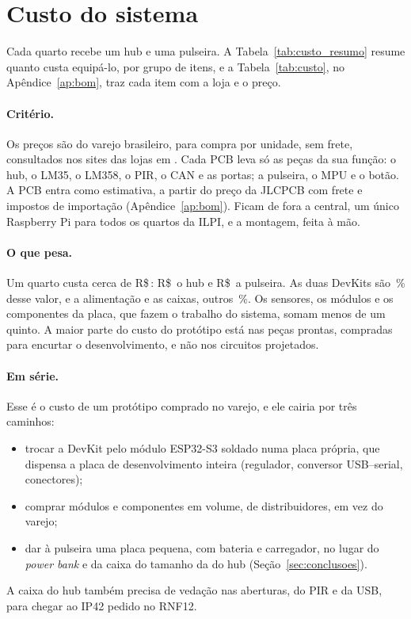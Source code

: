 \section{Custo do sistema}\label{sec:custo}
Cada quarto recebe um hub e uma pulseira. A Tabela~\ref{tab:custo_resumo} resume quanto custa
equipá-lo, por grupo de itens, e a Tabela~\ref{tab:custo}, no Apêndice~\ref{ap:bom}, traz
cada item com a loja e o preço.

\begin{table}[H]
\centering
\caption{Custo estimado de um quarto, por grupo de itens.}
\label{tab:custo_resumo}
\small

\end{table}

\paragraph{Critério.} Os preços são do varejo brasileiro, para compra por unidade, sem frete,
consultados nos sites das lojas em \custoData. Cada PCB leva só as peças da sua função: o hub,
o LM35, o LM358, o PIR, o CAN e as portas; a pulseira, o MPU e o botão. A PCB entra como
estimativa, a partir do preço da JLCPCB com frete e impostos de importação
(Apêndice~\ref{ap:bom}). Ficam de fora a central, um único Raspberry Pi para todos os quartos
da ILPI, e a montagem, feita à mão.

\paragraph{O que pesa.} Um quarto custa cerca de R\$\,\custoKit: R\$\,\custoHub{} o hub e
R\$\,\custoPulseira{} a pulseira. As duas DevKits são \custoDevkitPct\,\% desse valor, e a
alimentação e as caixas, outros \custoAlimCaixasPct\,\%. Os sensores, os módulos e os
componentes da placa, que fazem o trabalho do sistema, somam menos de um quinto. A maior parte
do custo do protótipo está nas peças prontas, compradas para encurtar o desenvolvimento, e não
nos circuitos projetados.

\paragraph{Em série.} Esse é o custo de um protótipo comprado no varejo, e ele cairia por três
caminhos:
\begin{itemize}
  \item trocar a DevKit pelo módulo ESP32-S3 soldado numa placa própria, que dispensa a placa de
        desenvolvimento inteira (regulador, conversor USB--serial, conectores);
  \item comprar módulos e componentes em volume, de distribuidores, em vez do varejo;
  \item dar à pulseira uma placa pequena, com bateria e carregador, no lugar do
        \textit{power bank} e da caixa do tamanho da do hub (Seção~\ref{sec:conclusoes}).
\end{itemize}
A caixa do hub também precisa de vedação nas aberturas, do PIR e da USB, para chegar ao IP42
pedido no RNF12.
